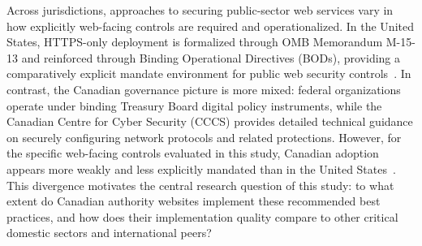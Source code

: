 \documentclass[a4paper,fleqn]{cas-sc}
\begin{document}

    Across jurisdictions, approaches to securing public-sector web services vary in how explicitly web-facing controls are required and operationalized. In the United States, HTTPS-only deployment is formalized through OMB Memorandum M-15-13 and reinforced through Binding Operational Directives (BODs), providing a comparatively explicit mandate environment for public web security controls~\cite{omb-m-15-13,cisa_bod_18_01}. In contrast, the Canadian governance picture is more mixed: federal organizations operate under binding Treasury Board digital policy instruments, while the Canadian Centre for Cyber Security (CCCS) provides detailed technical guidance on securely configuring network protocols and related protections. However, for the specific web-facing controls evaluated in this study, Canadian adoption appears more weakly and less explicitly mandated than in the United States~\cite{cccs-itsp-40062,cccs-itsm-60005}. This divergence motivates the central research question of this study: to what extent do Canadian authority websites implement these recommended best practices, and how does their implementation quality compare to other critical domestic sectors and international peers?
\end{document}
